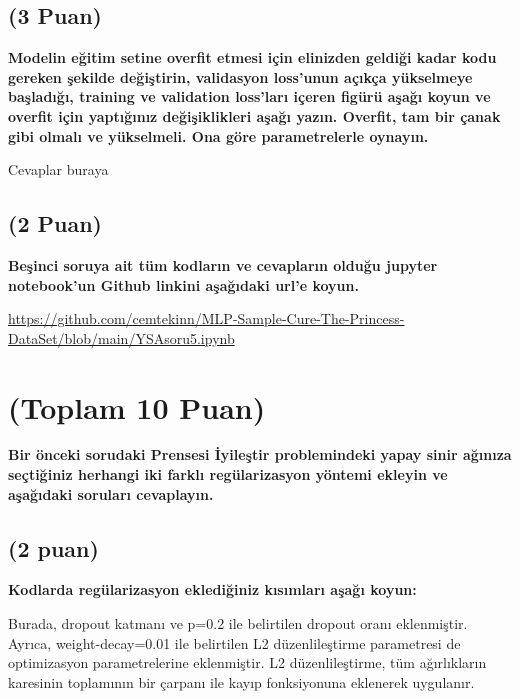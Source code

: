 \documentclass[11pt]{article}
\begin{document}
\subsection{(3 Puan)} \textbf{Modelin eğitim setine overfit etmesi için elinizden geldiği kadar kodu gereken şekilde değiştirin, validasyon loss'unun açıkça yükselmeye başladığı, training ve validation loss'ları içeren figürü aşağı koyun ve overfit için yaptığınız değişiklikleri aşağı yazın. Overfit, tam bir çanak gibi olmalı ve yükselmeli. Ona göre parametrelerle oynayın.}

Cevaplar buraya

\subsection{(2 Puan)} \textbf{Beşinci soruya ait tüm kodların ve cevapların olduğu jupyter notebook'un Github linkini aşağıdaki url'e koyun.}

\url{https://github.com/cemtekinn/MLP-Sample-Cure-The-Princess-DataSet/blob/main/YSAsoru5.ipynb}

\section{(Toplam 10 Puan)} \textbf{Bir önceki sorudaki Prensesi İyileştir problemindeki yapay sinir ağınıza seçtiğiniz herhangi iki farklı regülarizasyon yöntemi ekleyin ve aşağıdaki soruları cevaplayın.} 

\subsection{(2 puan)} \textbf{Kodlarda regülarizasyon eklediğiniz kısımları aşağı koyun:} 

Burada, dropout katmanı ve p=0.2 ile belirtilen dropout 
oranı eklenmiştir.  Ayrıca,  weight-decay=0.01 ile 
belirtilen L2 düzenlileştirme parametresi de 
optimizasyon parametrelerine eklenmiştir. L2 
düzenlileştirme, tüm ağırlıkların karesinin toplamının 
bir çarpanı ile kayıp fonksiyonuna eklenerek uygulanır.
\end{document}
